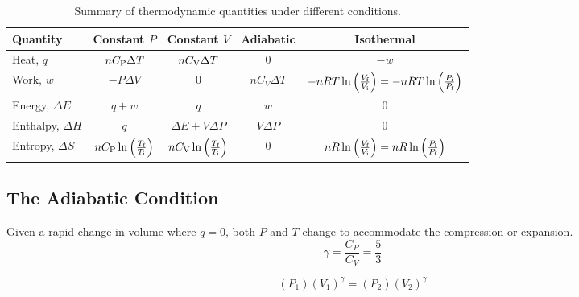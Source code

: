 \documentclass[10pt]{article}
\begin{document}
\bigskip\begin{table}[H]
	\centering
	\caption{Summary of thermodynamic quantities under different conditions.}
		\begin{tabular}{lcccc}
			\toprule
            Quantity  & Constant $P$ & Constant $V$ & Adiabatic & Isothermal\\
            \midrule
            Heat, $q$    & $nC_\textnormal{P}\Delta T$ & $nC_\textnormal{V}\Delta T$ & 0 & $-w$ \\
            Work, $w$    & $-P\Delta V$ & 0 & $nC_V\Delta T$ & $-nRT\ln \left(\frac{V_\textnormal{f}}{V_\textnormal{i}}\right) = -nRT\ln \left(\frac{P_\textnormal{i}}{P_\textnormal{f}}\right)$ \\
            Energy, $\Delta E$ & $q+w$ & $q$ & $w$ & 0 \\
            Enthalpy, $\Delta H$ & $q$ & $\Delta E + V\Delta P$ & $V\Delta P$ & 0  \\
            Entropy, $\Delta S$ & $nC_\textnormal{P}\ln \left(\frac{T_\textnormal{f}}{T_\textnormal{i}}\right)$ &  $nC_\textnormal{V}\ln \left(\frac{T_\textnormal{f}}{T_\textnormal{i}}\right)$ & 0 & $nR\ln \left(\frac{V_\textnormal{f}}{V_\textnormal{i}}\right) = nR\ln \left(\frac{P_\textnormal{i}}{P_\textnormal{f}}\right)$ \\          
			\bottomrule
		\end{tabular}
	\label{cond}
\end{table}




\subsection{The Adiabatic Condition}

Given a rapid change in volume where $q=0$, both $P$ and $T$ change to accommodate the compression or expansion.
\begin{equation*}
\gamma = \frac{C_P}{C_V} = \frac{5}{3}
\end{equation*}

\begin{equation*}
(P_1)(V_1)^\gamma = (P_2)(V_2)^\gamma
\end{equation*}
\end{document}
